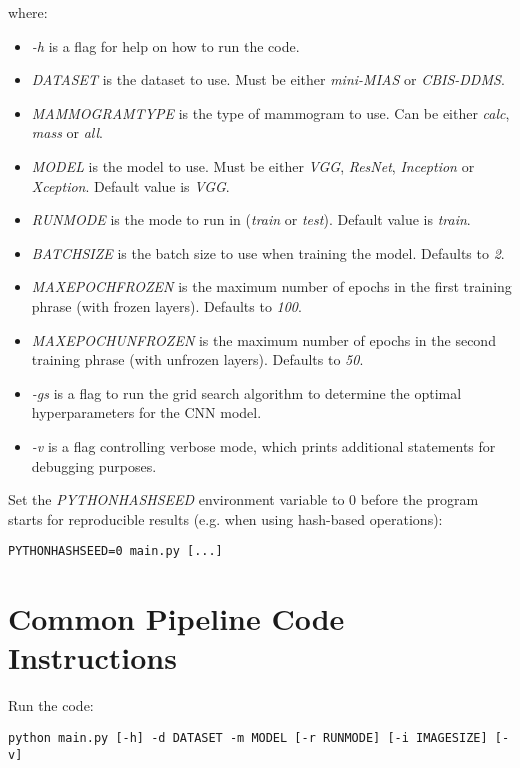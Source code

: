 where:
\begin{itemize}
    \item \textit{-h} is a  flag for help on how to run the code.
    \item \textit{DATASET} is the dataset to use. Must be either \textit{mini-MIAS} or \textit{CBIS-DDMS}.
    \item \textit{MAMMOGRAMTYPE} is the type of mammogram to use. Can be either \textit{calc}, \textit{mass} or \textit{all}.
    \item \textit{MODEL} is the model to use. Must be either \textit{VGG}, \textit{ResNet}, \textit{Inception} or \textit{Xception}. Default value is \textit{VGG}.
    \item \textit{RUNMODE} is the mode to run in (\textit{train} or \textit{test}). Default value is \textit{train}.
    \item \textit{BATCHSIZE} is the batch size to use when training the model. Defaults to \textit{2}.
    \item \textit{MAXEPOCHFROZEN} is the maximum number of epochs in the first training phrase (with frozen layers). Defaults to \textit{100}.
    \item \textit{MAXEPOCHUNFROZEN} is the maximum number of epochs in the second training phrase (with unfrozen layers). Defaults to \textit{50}.
    \item \textit{-gs} is a flag to run the grid search algorithm to determine the optimal hyperparameters for the CNN model.
    \item \textit{-v} is a flag controlling verbose mode, which prints additional statements for debugging purposes.
\end{itemize}

Set the \textit{PYTHONHASHSEED} environment variable to 0 before the program starts for reproducible results (e.g. when using hash-based operations):

\begin{lstlisting}
PYTHONHASHSEED=0 main.py [...]
\end{lstlisting}


\section{Common Pipeline Code Instructions}
\label{sec:appendix-common-pipeline-instructions}

Run the code:

\begin{lstlisting}
python main.py [-h] -d DATASET -m MODEL [-r RUNMODE] [-i IMAGESIZE] [-v]
\end{lstlisting}

